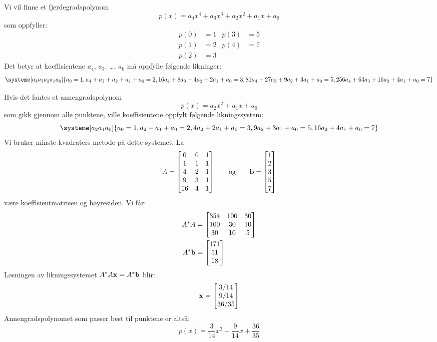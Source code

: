 \begin{losning}
\begin{punkt}
Vi vil finne et fjerdegradspolynom
\[
p(x) = a_4 x^4 + a_3 x^3 + a_2 x^2 + a_1 x + a_0
\]
som oppfyller:
\begin{align*}
p(0) &= 1 &
p(3) &= 5 \\
p(1) &= 2 &
p(4) &= 7 \\
p(2) &= 3
\end{align*}
Det betyr at koeffisientene $a_4$, $a_3$, \ldots, $a_0$ må oppfylle
følgende likninger:
\[
\systeme[a_4a_3a_2a_1a_0]{
a_0 = 1,
a_4 + a_3 + a_2 + a_1 + a_0 = 2,
16 a_4 + 8 a_3 + 4 a_2 + 2 a_1 + a_0 = 3,
81 a_4 + 27 a_3 + 9 a_2 + 3 a_1 + a_0 = 5,
256 a_4 + 64 a_3 + 16 a_2 + 4 a_1 + a_0 = 7
}
\]
\end{punkt}

\begin{punkt}
Hvis det fantes et annengradspolynom
\[
p(x) = a_2 x^2 + a_1 x + a_0
\]
som gikk gjennom alle punktene, ville koeffisientene oppfylt følgende
likningssystem:
\[
\systeme[a_2a_1a_0]{
a_0 = 1,
a_2 + a_1 + a_0 = 2,
4 a_2 + 2 a_1 + a_0 = 3,
9 a_2 + 3 a_1 + a_0 = 5,
16 a_2 + 4 a_1 + a_0 = 7
}
\]
Vi bruker minste kvadraters metode på dette systemet.
La
\[
A =
\begin{bmatrix}
 0 & 0 & 1 \\
 1 & 1 & 1 \\
 4 & 2 & 1 \\
 9 & 3 & 1 \\
16 & 4 & 1
\end{bmatrix}
\qquad\text{og}\qquad
\mathbf{b} = \begin{bmatrix} 1 \\ 2 \\ 3 \\ 5 \\ 7 \end{bmatrix}
\]
være koeffisientmatrisen og høyresiden.  Vi får:
\begin{align*}
A^* A &=
\begin{bmatrix}
354 & 100 & 30 \\
100 &  30 & 10 \\
 30 &  10 &  5
\end{bmatrix}
\\
A^* \mathbf{b} &= \begin{bmatrix} 171 \\ 51 \\ 18 \end{bmatrix}
\end{align*}
Løsningen av likningssystemet $A^* A \mathbf{x} = A^* \mathbf{b}$ blir:
\[
\mathbf{x} = \begin{bmatrix} 3/14 \\ 9/14 \\ 36/35 \end{bmatrix}
\]
Annengradspolynomet som passer best til punktene er altså:
\[
p(x) = \frac{3}{14} x^2 + \frac{9}{14} x + \frac{36}{35}
\]
\end{punkt}
\end{losning}



